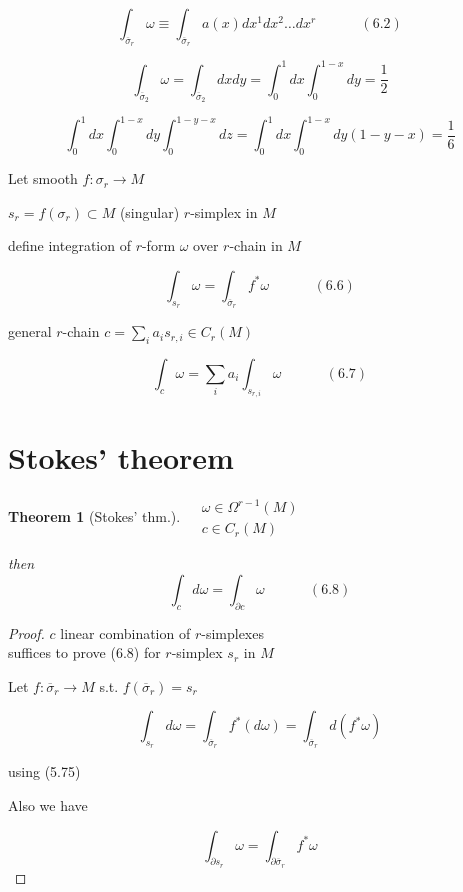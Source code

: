 \documentclass{book}
\newtheorem{theorem}{Theorem}
\begin{document}
\begin{equation}
\int_{ \overline{\sigma}_r } \omega \equiv \int_{ \overline{\sigma}_r } a(x) dx^1 dx^2 \dots dx^r \quad \quad \quad \, (6.2)
\end{equation}

\[
\int_{ \overline{\sigma}_2} \omega = \int_{ \overline{\sigma}_2 } dx dy = \int_0^1 dx \int_0^{1-x} dy = \frac{1}{2}
\]

\[
\int_0^1 dx \int_0^{1-x}dy \int_0^{1-y-x} dz = \int_0^1 dx \int_0^{1-x} dy (1-y-x) = \frac{1}{6}
\]

Let smooth $f:\sigma_r \to M$

$s_r = f(\sigma_r) \subset M$ (singular) $r$-simplex in $M$

define integration of $r$-form $\omega$ over $r$-chain in $M$

\begin{equation}
\int_{s_r} \omega = \int_{ \overline{\sigma}_r } f^* \omega \quad \quad \quad \, (6.6)
\end{equation}


general $r$-chain $c = \sum_i a_i s_{r,i}  \in C_r(M)$

\begin{equation}
  \int_c \omega = \sum_i a_i \int_{s_{r,i} } \omega \quad \quad \quad \, (6.7)
\end{equation}

\section{ Stokes' theorem }

\begin{theorem}[Stokes' thm.]
$\begin{aligned}
& \omega \in \Omega^{r-1}(M) \\ 
& c\in C_r(M)
\end{aligned}$

then
\begin{equation}
\int_c d\omega = \int_{\partial c} \omega \quad \quad \quad \, (6.8)
\end{equation}
\end{theorem}

\begin{proof}
$c$ linear combination of $r$-simplexes \\
suffices to prove (6.8) for $r$-simplex $s_r$ in $M$ 

Let $f:\overline{\sigma}_r \to M$ s.t. $f(\overline{\sigma}_r) = s_r$

\[
\int_{s_r} d\omega = \int_{ \overline{\sigma}_r} f^*(d\omega) = \int_{\overline{\sigma}_r} d(f^* \omega)
\]

using (5.75)

Also we have 

\[
\int_{\partial s_r} \omega = \int_{ \partial \overline{\sigma}_r } f^* \omega
\]
\end{proof}
\end{document}
